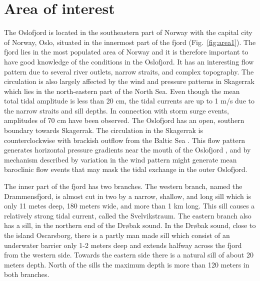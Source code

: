 \section{Area of interest}

The Oslofjord is located in the southeastern part of Norway with the capital city of Norway, Oslo, situated in the innermost part of the fjord (Fig.~\ref{fig:area1}). The fjord lies in the most populated area of Norway and it is therefore important to have good knowledge of the conditions in the Oslofjord. It has an interesting flow pattern due to several river outlets, narrow straits, and complex topography. The circulation is also largely affected by the wind and pressure patterns in Skagerrak which lies in the north-eastern part of the North Sea. 
Even though the mean total tidal amplitude is less than 20 cm, the tidal currents are up to 1 m/s due to the narrow straits and sill depths. In connection with storm surge events, amplitudes of 70 cm have been observed. The Oslofjord has an open, southern boundary towards Skagerrak. The circulation in the Skagerrak is counterclockwise with brackish outflow from the Baltic Sea \cite[]{rodhe96,svendsen96}. This flow pattern generates horizontal pressure gradients near the mouth of the Oslofjord \cite[]{baals90}, and by mechanism described by \cite{klinck81} variation in the wind pattern might generate mean baroclinic flow events that may mask the tidal exchange in the outer Oslofjord.

The inner part of the fjord has two branches. The western branch, named the Drammensfjord, is almost cut in two by a narrow, shallow, and long sill which is only 11 metes deep, 180 meters wide, and more than 1 km long. This sill causes a relatively strong tidal current, called the Svelvikstraum. The eastern branch also has a sill, in the northern end of the Dr{\o}bak sound. In the Dr{\o}bak sound, close to the island Oscarsborg, there is a partly man made sill which consist of an underwater barrier only 1-2 meters deep and extends halfway across the fjord from the western side. Towards the eastern side there is a natural sill of about 20 meters depth. North of the sills the maximum depth is more than 120 meters in both branches. 

